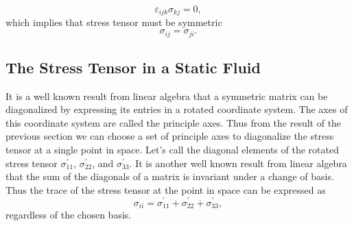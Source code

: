 \documentclass[12pt, letter]{report}
\begin{document}
\begin{equation}
\varepsilon_{ijk} \sigma_{kj} = 0,
\end{equation}
which implies that stress tensor must be symmetric \cite{Batchelor2000}
\begin{equation}
\sigma_{ij} = \sigma_{ji}.
\end{equation}
\subsection{The Stress Tensor in a Static Fluid}
It is a well known result from linear algebra that a symmetric matrix can be diagonalized by expressing its entries in a rotated coordinate system. The axes of this coordinate system are called the principle axes. Thus from the result of the previous section we can choose a set of principle axes to diagonalize the stress tensor at a single point in space. Let's call the diagonal elements of the rotated stress tensor $\sigma^{'}_{11}$, $\sigma^{'}_{22}$, and $\sigma^{'}_{33}$. It is another well known result from linear algebra that the sum of the diagonals of a matrix is invariant under a change of basis. Thus the trace of the stress tensor at the point in space can be expressed as
\begin{equation}
\sigma_{ii} = \sigma^{'}_{11} + \sigma^{'}_{22} + \sigma^{'}_{33},
\end{equation}
regardless of the chosen basis.
\end{document}
